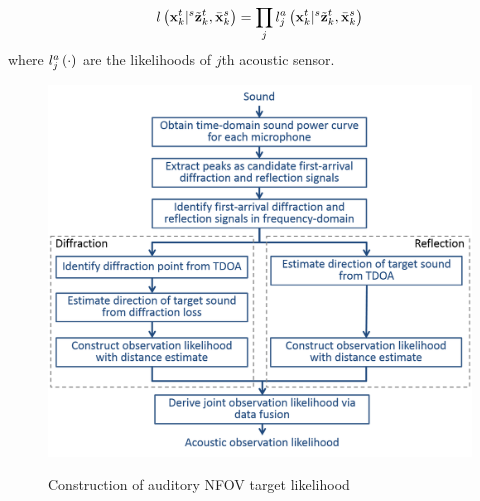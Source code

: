 \documentclass[letterpaper, 10 pt, conference]{ieeeconf}  %
\begin{document}
\begin{eqnarray}\label{eq:joint}
l \left ( \mathbf{x}_{k}^{t}|{}^{s}\tilde {\mathbf{z}}_{k}^{t},\bar {\mathbf{x}}_{k}^{s} \right ) =  \prod_j l_j^{a} \left ( \mathbf{x}_{k}^{t}|{}^{s}\tilde {\mathbf{z}}_{k}^{t},\bar {\mathbf{x}}_{k}^{s} \right ) 
\end{eqnarray}
where $l_j^{a} \left ( \cdot \right )$ are the likelihoods of $j$th acoustic sensor.

\begin{figure}[h]
	{\centering
		\includegraphics[width=\columnwidth]{Figures/auditory_procedure.png}
	}
	\caption{\footnotesize {Construction of auditory NFOV target likelihood} }
	\label{fig:auditory_procedure}
\end{figure}
\end{document}
